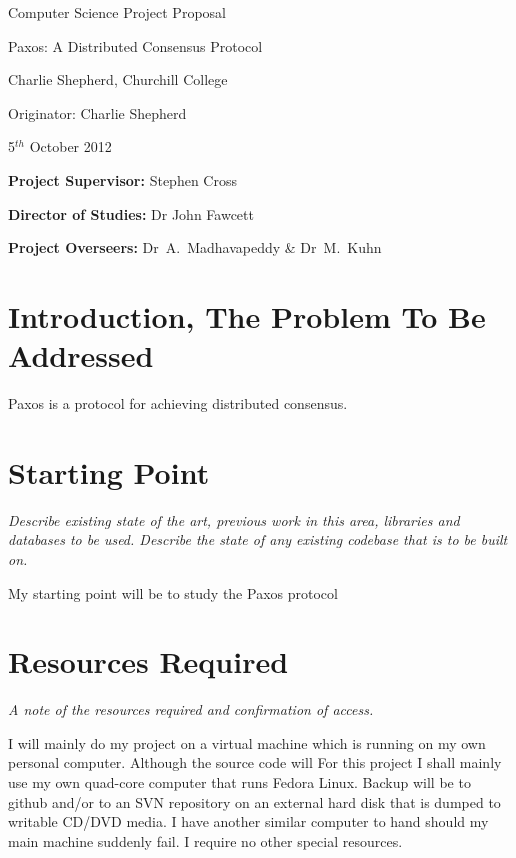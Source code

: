 \vfil

\centerline{\Large Computer Science Project Proposal}
\vspace{0.4in}
\centerline{\Large Paxos: A Distributed Consensus Protocol}
\vspace{0.4in}
\centerline{\large Charlie Shepherd, Churchill College}
\vspace{0.3in}
\centerline{\large Originator: Charlie Shepherd}
\vspace{0.3in}
\centerline{\large 5$^{th}$ October 2012}

\vfil


\noindent
{\bf Project Supervisor:} Stephen Cross
\vspace{0.2in}

\noindent
{\bf Director of Studies:} Dr John Fawcett
\vspace{0.2in}
\noindent

\noindent
{\bf Project Overseers:} Dr~A.~Madhavapeddy \& Dr~M.~Kuhn



\section*{Introduction, The Problem To Be Addressed}

Paxos is a protocol for achieving distributed consensus. 

\section*{Starting Point}

{\em Describe existing state of the art, previous work in this area, libraries and databases to be used.
Describe the state of any existing codebase that is to be built on.  }

My starting point will be to study the Paxos protocol

\section*{Resources Required}

{\em A note of the resources required and confirmation of access.}

I will mainly do my project on a virtual machine which is running on my own personal computer.
Although the source code will
For this project I shall mainly use my own quad-core computer that runs Fedora Linux. Backup
will be to github and/or to an SVN repository on an external hard disk that is dumped to writable CD/DVD media.
I have another similar computer to hand should my main machine suddenly fail.
I require no other special resources.

